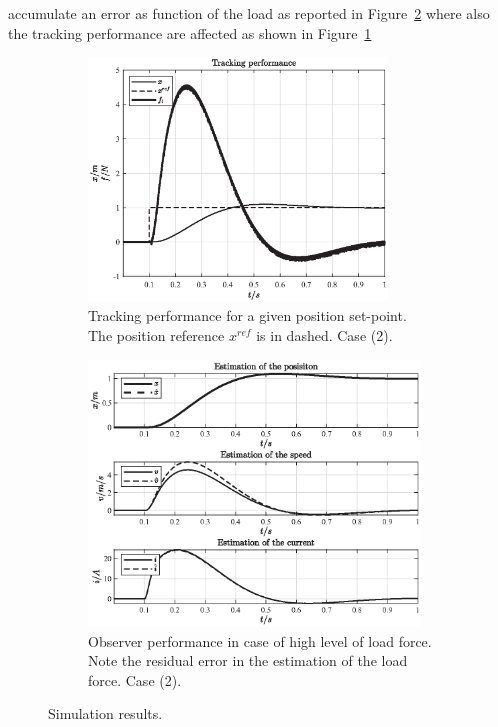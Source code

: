 \documentclass[11pt,a4paper,oneside]{book}
\numberwithin{equation}{section}
\theoremstyle{it}
\theoremstyle{definition}
\begin{document}
accumulate an error as function of the load as reported in 
Figure~\ref{figure_ctrl_coil_sim_results_4} where also the tracking performance 
are affected as shown in Figure~\ref{figure_ctrl_coil_sim_results_3}
\begin{figure}[H]
	\centering
	\begin{subfigure}{.5\textwidth}
		\centering
		\includegraphics[width = 225pt, angle = 0, 
		keepaspectratio]{figures/moving_coil/track_x_2.eps}
		\captionsetup{width=0.75\textwidth}
		\caption{Tracking performance for a given position set-point. The 
			position reference $x^{ref}$ is in dashed. Case (2).}
		\label{figure_ctrl_coil_sim_results_3}
	\end{subfigure}%
	\begin{subfigure}{.5\textwidth}
		\centering
		\includegraphics[width = 250pt, angle = 0, 
		keepaspectratio]{figures/moving_coil/observer_2.eps}
		\captionsetup{width=0.75\textwidth}
		\caption{Observer performance in case of high level of load force. Note 
			the residual error in the estimation of the load force. Case (2).}
		\label{figure_ctrl_coil_sim_results_4}
	\end{subfigure}
	\caption{Simulation results.}
	\label{}
\end{figure}
\end{document}
